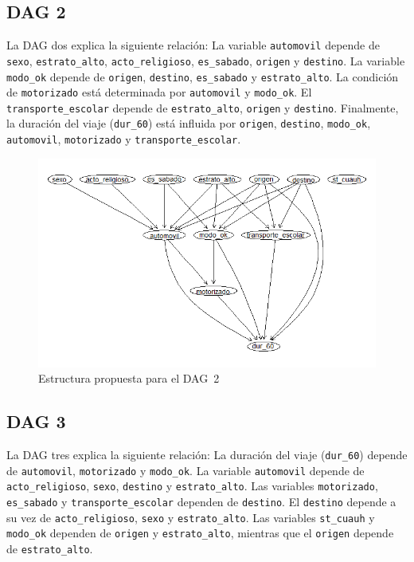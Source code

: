 \documentclass[eng]{ajceam-class}
\begin{document}
\subsection{DAG 2}

La DAG dos explica la siguiente relación: 
La variable \texttt{automovil} depende de \texttt{sexo}, \texttt{estrato\_alto}, 
\texttt{acto\_religioso}, \texttt{es\_sabado}, \texttt{origen} y \texttt{destino}. 
La variable \texttt{modo\_ok} depende de \texttt{origen}, \texttt{destino}, 
\texttt{es\_sabado} y \texttt{estrato\_alto}. 
La condición de \texttt{motorizado} está determinada por \texttt{automovil} y \texttt{modo\_ok}. 
El \texttt{transporte\_escolar} depende de \texttt{estrato\_alto}, \texttt{origen} y \texttt{destino}. 
Finalmente, la duración del viaje (\texttt{dur\_60}) está influida por \texttt{origen}, 
\texttt{destino}, \texttt{modo\_ok}, \texttt{automovil}, \texttt{motorizado} 
y \texttt{transporte\_escolar}.

\begin{figure}[H] 
 \centering
 \includegraphics[width=0.8\columnwidth]{dag2} 
 \caption{Estructura propuesta para el DAG~2} \label{fig:dag2}
\end{figure}

\subsection{DAG 3}

La DAG tres explica la siguiente relación: 
La duración del viaje (\texttt{dur\_60}) depende de \texttt{automovil}, 
\texttt{motorizado} y \texttt{modo\_ok}. 
La variable \texttt{automovil} depende de \texttt{acto\_religioso}, 
\texttt{sexo}, \texttt{destino} y \texttt{estrato\_alto}. 
Las variables \texttt{motorizado}, \texttt{es\_sabado} y 
\texttt{transporte\_escolar} dependen de \texttt{destino}. 
El \texttt{destino} depende a su vez de \texttt{acto\_religioso}, 
\texttt{sexo} y \texttt{estrato\_alto}. 
Las variables \texttt{st\_cuauh} y \texttt{modo\_ok} dependen de 
\texttt{origen} y \texttt{estrato\_alto}, mientras que el \texttt{origen} 
depende de \texttt{estrato\_alto}.
\end{document}
